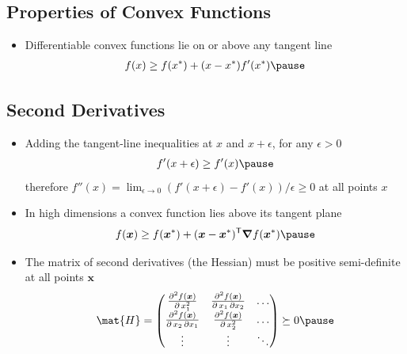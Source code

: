 
\begin{slide}
\section[-2]{Properties of Convex Functions}

\pb
\begin{itemize}
\item Differentiable convex functions lie on or above any tangent line
  \begin{align*}
    f(x) \geq f(x^*) + (x-x^*) f'(x^*)\pause
  \end{align*}
  \begin{center}
    \pauseb
  \end{center}
\end{itemize}

\end{slide}


\begin{slide}
\section[-2]{Second Derivatives}

\begin{PauseHighLight}
  \begin{itemize}\squeeze
  \item Adding the tangent-line inequalities at $x$ and $x+\epsilon$,
    for any $\epsilon>0$
    \begin{align*}
      f'(x+\epsilon)\geq f'(x)\pause
    \end{align*}
    therefore $f''(x) = \lim_{\epsilon\rightarrow0} (f'(x+\epsilon)-
    f'(x))/\epsilon \geq 0$ at all points $x$\pause
  \item In high dimensions a convex function lies above its tangent plane
    \begin{align*}
      f(\bm{x}) \geq f(\bm{x}^*) + (\bm{x}-\bm{x}^*)^\tr \grad f(\bm{x}^*)\pause
    \end{align*}
  \item The matrix of second derivatives (the Hessian) must be
    positive semi-definite at all points $\bm{x}$
    {\small \begin{align*}
      \mat{H} =
      \begin{pmatrix}
        \pd[2]{f(\bm{x})}{x_1^2} & \pd[2]{f(\bm{x})}{x_1\, \partial
          x_2} & \ldots \\
        \pd[2]{f(\bm{x})}{x_2 \, \partial x_1} &
        \pd[2]{f(\bm{x})}{x_2^2} & \ldots\\
        \vdots & \vdots & \ddots
      \end{pmatrix} \succeq 0\pause
    \end{align*} }
  \end{itemize}
\end{PauseHighLight}

\end{slide}

